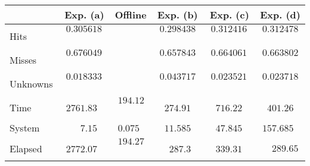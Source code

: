 





\begin{tabular}{l|r|r|r|r|r}
         & Exp. (a)         & Offline       & Exp. (b)          & Exp. (c)          & Exp. (d)          \\\hline
Hits     & $\ 0.305618\ $\  &               & $\ 0.298438\ $\   & $\ 0.312416\ $\   & $\ 0.312478\ $\   \\\hline
Misses   & $\ 0.676049\ $\  &               & $\ 0.657843\ $\   & $\ 0.664061\ $\   & $\ 0.663802\ $\   \\\hline
Unknowns & $\ 0.018333\ $\  &               & $\ 0.043717\ $\   & $\ 0.023521\ $\   & $\ 0.023718\ $\   \\\hline
Time     & $\ 2761.83\ $\   & $\ 194.12\ $\ & $\ 274.91\ $\     & $\ 716.22\ $\     & $\ 401.26\ $\     \\\hline
System   & $\ 7.15\ $\      & $\ 0.075\ $\  & $\ 11.585\ $\     & $\ 47.845\ $\     & $\ 157.685\ $\    \\\hline
Elapsed  & $\ 2772.07\ $\   & $\ 194.27\ $\ & $\ 287.3\ $\      & $\ 339.31\ $\     & $\ 289.65\ $    
\end{tabular}

